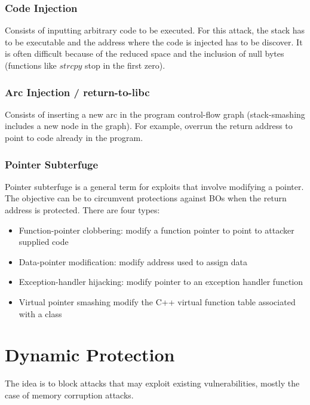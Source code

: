\documentclass[10pt,a4paper]{report}
\begin{document}
\subsubsection{Code Injection}
Consists of inputting arbitrary code to be executed. For this attack, the stack has to be executable and the address where the code is injected has to be discover. It is often difficult because of the reduced space and the inclusion of null bytes (functions like $strcpy$ stop in the first zero).
\subsubsection{Arc Injection / return-to-libc}
Consists of inserting a new arc in the program control-flow graph (stack-smashing includes a new node in the graph). For example, overrun the return address to point to code already in the program.
\subsubsection{Pointer Subterfuge}
Pointer subterfuge is a general term for exploits that involve modifying a pointer. The objective can be to circumvent protections against BOs when the return address is protected. There are four types:
\begin{itemize}
\item Function-pointer clobbering: modify a function pointer to point to attacker supplied code
\item Data-pointer modification: modify address used to assign data
\item Exception-handler hijacking: modify pointer to an exception handler function
\item Virtual pointer smashing modify the C++ virtual function table associated with a class
\end{itemize}
\section{Dynamic Protection}
The idea is to block attacks that may exploit existing vulnerabilities, mostly the case of memory corruption attacks.
\end{document}
